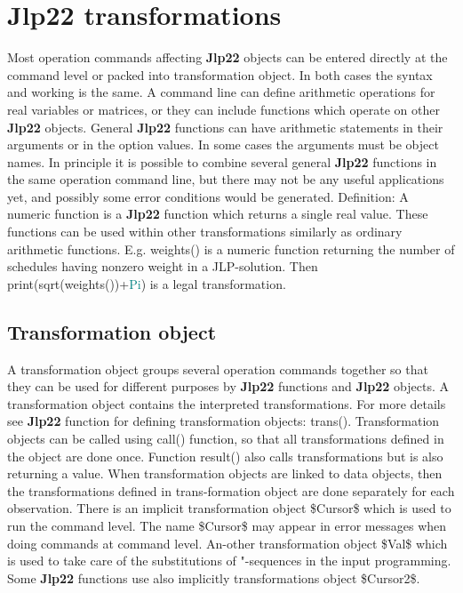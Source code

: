 {\section{\textbf{Jlp22} transformations} 
\label{jtrans} 
Most operation commands affecting \textbf{Jlp22} objects can be entered directly at the command level or 
packed into transformation object. In both cases the syntax and working is the same. A 
command line can define arithmetic operations for real variables or matrices, or they can 
include functions which operate on other \textbf{Jlp22} objects. General \textbf{Jlp22} functions can have arithmetic 
statements in their arguments or in the option values. In some cases the arguments must be 
object names. In principle it is possible to combine several general \textbf{Jlp22} functions in the same 
operation command line, but there may not be any useful applications yet, and possibly some 
error conditions would be generated. 
Definition: A numeric function is a \textbf{Jlp22} function which returns a single real value. These functions 
can be used within other transformations similarly as ordinary arithmetic functions. E.g. 
\textcolor{VioletRed}{weights}() is a numeric function returning the number of schedules having nonzero weight 
in a JLP-solution. Then \textcolor{VioletRed}{print}(\textcolor{VioletRed}{sqrt}(\textcolor{VioletRed}{weights}())+\textcolor{teal}{Pi}) is a legal transformation. 
\subsection{Transformation object} 
\label{transo} 
A transformation object groups several operation commands together so that they 
can be used for different purposes by \textbf{Jlp22} functions and \textbf{Jlp22} objects. A 
transformation object contains the interpreted transformations. For more details 
see \textbf{Jlp22} function for defining transformation objects: \textcolor{VioletRed}{trans}(). 
Transformation objects can be called using \textcolor{VioletRed}{call}() function, so that all 
transformations defined in the object are done once. Function result() also calls 
transformations but is also returning a value. When transformation objects are 
linked to data objects, then the transformations defined in trans-formation object 
are done separately for each observation. 
There is an implicit transformation object \$Cursor\$ which is used to run the 
command level. The name \$Cursor\$ may appear in error messages when doing 
commands at command level.  An-other transformation object \$Val\$ which is used to 
take care of the substitutions of "-sequences in the input programming. Some \textbf{Jlp22} 
functions use also implicitly transformations object \$Cursor2\$. 
}
